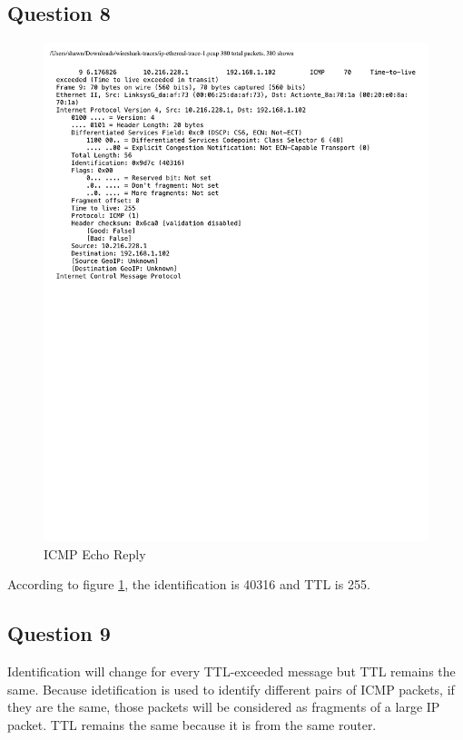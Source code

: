 \documentclass[titlepage, paper=a4, fontsize=11pt]{scrartcl} %
\numberwithin{equation}{section} %
\numberwithin{figure}{section} %
\numberwithin{table}{section} %
\begin{document}
\subsection*{Question 8}
\begin{figure}[!ht]
    \centering
    \includegraphics[width=\textwidth]{images/lab2-q8.pdf}
    \caption{ICMP Echo Reply}
    \label{fig:ip-icmp}
\end{figure}
According to figure \ref{fig:ip-icmp}, the identification is 40316 and TTL is 255. \\

\subsection*{Question 9}
Identification will change for every TTL-exceeded message but TTL remains the same. Because idetification is used to identify different pairs of ICMP packets, if they are the same, those packets will be considered as fragments of a large IP packet. TTL remains the same because it is from the same router. \\
\end{document}
